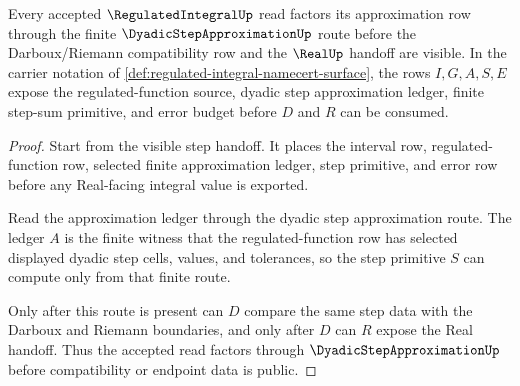 \begin{theorem}
\label{thm:regulated-integral-dyadic-step-approximation-factorization}
Every accepted $\RegulatedIntegralUp$ read factors its approximation row through the finite $\DyadicStepApproximationUp$ route before the Darboux/Riemann compatibility row and the $\RealUp$ handoff are visible. In the carrier notation of \autoref{def:regulated-integral-namecert-surface}, the rows $I,G,A,S,E$ expose the regulated-function source, dyadic step approximation ledger, finite step-sum primitive, and error budget before $D$ and $R$ can be consumed.
\end{theorem}
\begin{proof}
Start from the visible step handoff. It places the interval row, regulated-function row, selected finite approximation ledger, step primitive, and error row before any Real-facing integral value is exported.

Read the approximation ledger through the dyadic step approximation route. The ledger $A$ is the finite witness that the regulated-function row has selected displayed dyadic step cells, values, and tolerances, so the step primitive $S$ can compute only from that finite route.

Only after this route is present can $D$ compare the same step data with the Darboux and Riemann boundaries, and only after $D$ can $R$ expose the Real handoff. Thus the accepted read factors through $\DyadicStepApproximationUp$ before compatibility or endpoint data is public.
\end{proof}

